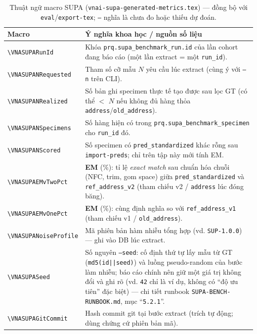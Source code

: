 \begin{table}[h]
\centering
\caption{Thuật ngữ macro SUPA (\texttt{vnai-supa-generated-metrics.tex}) --- đồng bộ với \texttt{eval}/\texttt{export-tex}; \texttt{---} nghĩa là chưa đo hoặc thiếu dự đoán.}
\label{tab:supa-macro-glossary}
\small
\begin{tabular}{@{}p{4.2cm}p{10.5cm}@{}}
\toprule
\textbf{Macro} & \textbf{Ý nghĩa khoa học / nguồn số liệu} \\
\midrule
\texttt{\textbackslash VNASUPARunId} & Khóa \texttt{prq.supa\_benchmark\_run.id} của lần cohort đang báo cáo (một lần extract = một \texttt{run\_id}). \\
\texttt{\textbackslash VNASUPANRequested} & Tham số cỡ mẫu \(N\) yêu cầu lúc extract (cùng ý với \texttt{---n} trên CLI). \\
\texttt{\textbackslash VNASUPANRealized} & Số bản ghi specimen thực tế tạo được sau lọc GT (có thể \(<\) \(N\) nếu không đủ hàng thỏa \texttt{address}/\texttt{old\_address}). \\
\texttt{\textbackslash VNASUPANSpecimens} & Số hàng hiện có trong \texttt{prq.supa\_benchmark\_specimen} cho \texttt{run\_id} đó. \\
\texttt{\textbackslash VNASUPANScored} & Số specimen có \texttt{pred\_standardized} khác rỗng sau \texttt{import-preds}; chỉ trên tập này mới tính EM. \\
\texttt{\textbackslash VNASUPAEMvTwoPct} & \textbf{EM\@v2} (\%): tỉ lệ \emph{exact match} sau chuẩn hóa chuỗi (NFC, trim, gom space) giữa \texttt{pred\_standardized} và \texttt{ref\_address\_v2} (tham chiếu v2 / \texttt{address} lúc đóng băng). \\
\texttt{\textbackslash VNASUPAEMvOnePct} & \textbf{EM\@v1} (\%): cùng định nghĩa so với \texttt{ref\_address\_v1} (tham chiếu v1 / \texttt{old\_address}). \\
\texttt{\textbackslash VNASUPANoiseProfile} & Mã phiên bản hàm nhiễu tổng hợp (vd. \texttt{SUP-1.0.0}) --- ghi vào DB lúc extract. \\
\texttt{\textbackslash VNASUPASeed} & Số nguyên \texttt{---seed}: cố định thứ tự lấy mẫu từ GT (\texttt{md5(id||seed)}) và luồng pseudo-random của bước làm nhiễu; báo cáo chính nên giữ một giá trị không đổi và ghi rõ (vd. \texttt{42} chỉ là ví dụ, không có ``độ ưu tiên'' đặc biệt) --- chi tiết runbook \texttt{SUPA-BENCH-RUNBOOK.md}, mục ``\texttt{5.2.1}''. \\
\texttt{\textbackslash VNASUPAGitCommit} & Hash commit git tại bước extract (trích tự động; dùng chứng cứ phiên bản mã). \\
\bottomrule
\end{tabular}
\end{table}

